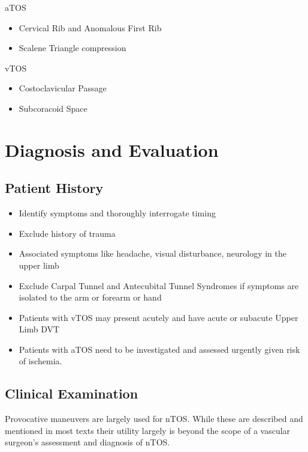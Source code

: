 \documentclass[
]{book}
\begin{document}
aTOS

\begin{itemize}
\item
  Cervical Rib and Anomalous First Rib
\item
  Scalene Triangle compression
\end{itemize}

vTOS

\begin{itemize}
\item
  Costoclavicular Passage
\item
  Subcoracoid Space
\end{itemize}

\hypertarget{diagnosis-and-evaluation}{%
\section{Diagnosis and Evaluation}\label{diagnosis-and-evaluation}}

\hypertarget{patient-history}{%
\subsection{Patient History}\label{patient-history}}

\begin{itemize}
\item
  Identify symptoms and thoroughly interrogate timing
\item
  Exclude history of trauma
\item
  Associated symptoms like headache, visual disturbance, neurology in
  the upper limb
\item
  Exclude Carpal Tunnel and Antecubital Tunnel Syndromes if symptoms
  are isolated to the arm or forearm or hand
\item
  Patients with vTOS may present acutely and have acute or subacute
  Upper Limb DVT
\item
  Patients with aTOS need to be investigated and assessed urgently
  given risk of ischemia.~
\end{itemize}

\hypertarget{clinical-examination}{%
\subsection{Clinical Examination}\label{clinical-examination}}

Provocative maneuvers are largely used for nTOS. While these are
described and mentioned in most texts their utility largely is beyond
the scope of a vascular surgeon's assessment and diagnosis of nTOS.
\end{document}
